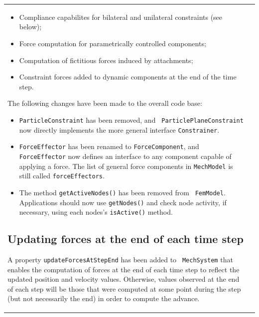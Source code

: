 \documentclass{article}
\begin{document}
\begin{tabular}{ll}
\begin{itemize}

\item Compliance capabilites for bilateral and unilateral
constraints (see below);

\item Force computation for parametrically controlled components;

\item Computation of fictitious forces induced by attachments;

\item Constraint forces added to dynamic components at the end of
the time step.

\end{itemize}

The following changes have been made to the overall code base:

\begin{itemize}

\item {\tt ParticleConstraint} has been removed, and {\tt
ParticlePlaneConstraint} now directly implements the more general
interface {\tt Constrainer}.

\item {\tt ForceEffector} has been renamed to {\tt ForceComponent},
and {\tt ForceEffector} now defines an interface to any component
capable of applying a force. The list of general force components in
{\tt MechModel} is still called {\tt forceEffectors}.

\item The method {\tt getActiveNodes()} has been removed from {\tt
FemModel}. Applications should now use {\tt getNodes()} and check node
activity, if necessary, using each nodes's {\tt isActive()} method.

\end{itemize}

\subsection*{Updating forces at the end of each time step}

A property {\tt updateForcesAtStepEnd} has been added to {\tt
MechSystem} that enables the computation of forces at the end of each
time step to reflect the updated position and velocity values.
Otherwise, values observed at the end of each step will be those that
were computed at some point during the step (but not necessarily the
end) in order to compute the advance.


\end{tabular}
\end{document}
